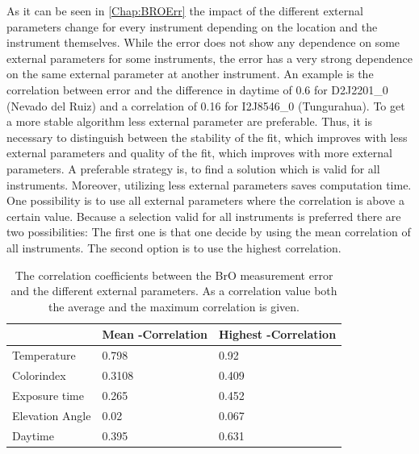 \documentclass  [
  paper    = a4,
  BCOR     = 10mm,
  twoside,
  fontsize = 12pt,
  fleqn,
  toc      = bibnumbered,
  toc      = listofnumbered,
  numbers  = noendperiod,
  headings = normal,
  listof   = leveldown,
  version  = 3.03
]                                       {scrreprt}
\newcommand{\myrowcolour}{\rowcolor[gray]{0.925}}
\begin{document}
As it can be seen in \cref{Chap:BROErr} the impact of the different external parameters change for every instrument depending on the location and the instrument themselves. 
While the   error does not show any dependence on some external parameters for some instruments, the error has a very strong dependence on the same external parameter at another instrument. An example is the correlation between   error and the difference in daytime of 0.6 for D2J2201\_0 (Nevado del Ruiz) and a correlation of 0.16 for I2J8546\_0 (Tungurahua).
To get a more stable algorithm less external parameter are preferable. Thus, it is necessary to distinguish between the stability of the fit, which improves with less external parameters and quality of the fit, which improves with more external parameters. 
A preferable strategy is, to find a solution which is valid for all instruments. Moreover, utilizing less external parameters saves computation time.
One possibility is to use all external parameters where the correlation is above a certain value. Because a selection valid for all instruments is preferred there are two possibilities: The first one is that one decide by using the mean correlation of all instruments. The second option is to use the highest correlation.

\begin{table}[h]
	\centering
	\caption{The correlation coefficients between the BrO measurement error and the different external parameters. As a correlation value both the average and the maximum correlation is given.}
	\begin{tabular}{p{4cm}p{3cm}p{3cm}}
		&  Mean -Correlation&  Highest   -Correlation\\
		\toprule
		Temperature &0.798&    0.92\\
		\myrowcolour%
		Colorindex &0.3108&    0.409\\
		Exposure time &0.265&    0.452\\
		\myrowcolour%
		Elevation Angle &0.02&    0.067\\
		Daytime &0.395&    0.631\\
		\bottomrule        
	\end{tabular}
	\label{tab:CorrEP}
\end{table}
\end{document}

